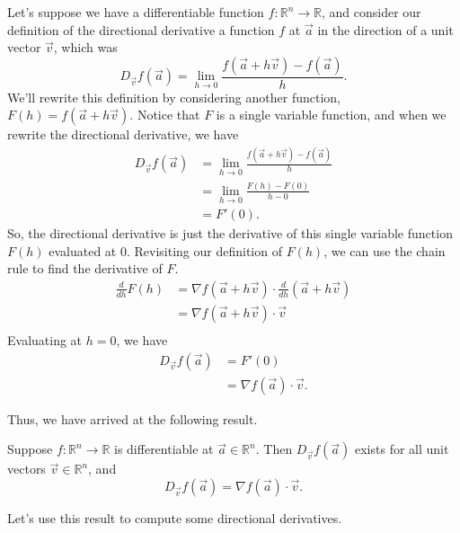 \documentclass{ximera}
\begin{document}
Let's suppose we have a differentiable function $f:\mathbb{R}^n\rightarrow\mathbb{R}$, and consider our definition of the directional derivative a function $f$ at $\vec{a}$ in the direction of a unit vector $\vec{v}$, which was
\[
D_{\vec{v}}f(\vec{a}) = \lim_{h\rightarrow 0}\frac{f(\vec{a}+h\vec{v})-f(\vec{a})}{h}.
\]
We'll rewrite this definition by considering another function, $F(h) = f(\vec{a}+h\vec{v})$. Notice that $F$ is a single variable function, and when we rewrite the directional derivative, we have
\begin{align*}
D_{\vec{v}}f(\vec{a})& = \lim_{h\rightarrow 0}\frac{f(\vec{a}+h\vec{v})-f(\vec{a})}{h}\\
&= \lim_{h\rightarrow 0 }\frac{F(h)-F(0)}{h-0}\\
&= F'(0).
\end{align*}
So, the directional derivative is just the derivative of this single variable function $F(h)$ evaluated at $0$. Revisiting our definition of $F(h)$, we can use the chain rule to find the derivative of $F$.
\begin{align*}
\frac{d}{dh}F(h) &= \nabla f(\vec{a}+h\vec{v})\cdot\frac{d}{dh}(\vec{a}+h\vec{v})\\
&= \nabla f(\vec{a}+h\vec{v})\cdot\vec{v}\\
\end{align*}
Evaluating at $h=0$, we have
\begin{align*}
D_{\vec{v}}f(\vec{a}) &= F'(0)\\
&= \nabla f(\vec{a})\cdot \vec{v}.
\end{align*}

Thus, we have arrived at the following result.

\begin{theorem}
Suppose $f:\mathbb{R}^n\rightarrow\mathbb{R}$ is differentiable at $\vec{a}\in\mathbb{R}^n$. Then $D_{\vec{v}}f(\vec{a})$ exists for all unit vectors $\vec{v}\in\mathbb{R}^n$, and 
\[
D_{\vec{v}}f(\vec{a}) = \nabla f(\vec{a})\cdot \vec{v}.
\]
\end{theorem}

Let's use this result to compute some directional derivatives.
\end{document}
